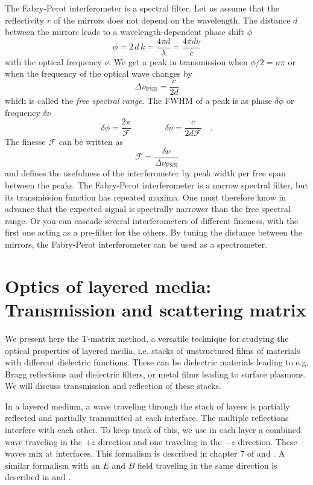 The Fabry-Perot interferometer is a spectral filter. Let us assume that the reflectivity $r$ of the mirrors does not depend on the wavelength. The distance $d$ between the mirrors leads to a wavelength-dependent phase shift $\phi$
\begin{equation}
  \phi = 2 \, d \, k = \frac{4 \pi d}{\lambda} =  \frac{4 \pi d  \nu}{c}
\end{equation}
with the optical frequency $\nu$. We get a peak in transmission when $\phi/2  = n \pi$ or when the frequency of the optical wave changes by 
\begin{equation}
  \Delta \nu_\text{FSR} = \frac{c}{2d}
\end{equation}
which is called the \emph{free spectral range}. The FWHM of a peak is as phase $ \delta \phi $ or frequency $ \delta \nu$ 
\begin{equation}
  \delta \phi = \frac{2 \pi }{\mathcal{F}} \qquad\qquad \delta \nu = \frac{c}{2 d \mathcal{F}}  \quad .
\end{equation}
The finesse $\mathcal{F}$ can be written as
\begin{equation}
  \mathcal{F} = \frac{ \delta \nu}{ \Delta \nu_\text{FSR}}
\end{equation}
and defines the usefulness of the interferometer by peak width per free span between the peaks. The Fabry-Perot interferometer is a narrow spectral filter, but its transmission function has repeated maxima. One must therefore know in advance that the expected signal is spectrally narrower than the free spectral range. Or you can cascade several interferometers of different fineness, with the first one acting as a pre-filter for the others. By tuning the distance between the mirrors, the Fabry-Perot interferometer can be used as a spectrometer.


\section{Optics of layered media: Transmission and scattering matrix}
We present here the T-matrix method, a versatile technique for studying the optical properties of layered media, i.e. stacks of unstructured films of materials with different dielectric functions. These can be dielectric materials leading to e.g. Bragg reflections and dielectric filters, or metal films leading to surface plasmons. We will discuss transmission and reflection of these stacks.

In a layered medium, a wave traveling through the stack of layers is partially reflected and partially transmitted at each interface. The multiple reflections interfere with each other. To keep track of this, we use in each layer a combined wave traveling in the $+z$ direction and one traveling in the $-z$ direction. These waves mix at interfaces. This formalism is described in chapter 7 of \cite{SalehTeich1991} and \cite{Yeh2005}. A similar formalism with an $E$ and $B$ field traveling in the same direction is described in \cite{Pedrotti2008} and \cite{Macleod2001}.

